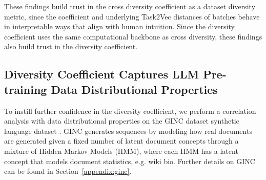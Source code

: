 \begin{itemize}
\end{itemize}
These findings build trust in the cross diversity coefficient as a dataset diversity metric, since the coefficient and underlying Task2Vec distances of batches behave in interpretable ways that align with human intuition. Since the diversity coefficient uses the same computational backbone as cross diversity, these findings also build trust in the diversity coefficient. %


\subsection{Diversity Coefficient Captures LLM Pre-training Data Distributional Properties} \label{body:ginc}
To instill further confidence in the diversity coefficient, we perform a correlation analysis with data distributional properties on the GINC dataset synthetic language dataset \citep{ginc}.
GINC generates sequences by modeling how real documents are generated given a fixed number of latent document concepts through a mixture of Hidden Markov Models (HMM), where each HMM has a latent concept that models document statistics, e.g. wiki bio.
Further details on GINC can be found in Section~\ref{appendix:ginc}.

